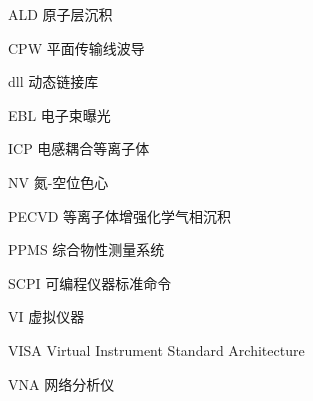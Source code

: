 

\begin{denotation}[3cm]
\item[ALD] 原子层沉积
\item[CPW] 平面传输线波导
\item[dll] 动态链接库
\item[EBL] 电子束曝光
\item[ICP] 电感耦合等离子体
\item[NV] 氮-空位色心
\item[PECVD] 等离子体增强化学气相沉积
\item[PPMS] 综合物性测量系统
\item[SCPI] 可编程仪器标准命令
\item[VI] 虚拟仪器
\item[VISA] Virtual Instrument Standard Architecture
\item[VNA] 网络分析仪
\end{denotation}
